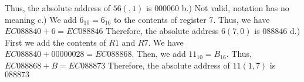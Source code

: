 \documentclass{report}
\begin{document}
    \bigbreak \noindent 
    Thus, the absolute address of $56(,1)$ is $000060$
    \bigbreak \noindent 
    b.) Not valid, notation has no meaning
    \bigbreak \noindent 
    c.) We add $6_{10} = 6_{16}$ to the contents of register 7. Thus, we have $EC088840 + 6 = EC088846$
    \bigbreak \noindent 
    Therefore, the absolute address $6(7,0)$ is $088846$
    \bigbreak \noindent 
    d.) First we add the contents of $R1$ and $R7$. We have $EC088840 + 00000028 = EC088868$. Then, we add $11_{10} = B_{16}$. Thus, $EC088868 + B = EC088873$
    \bigbreak \noindent 
    Therefore, the absolute address of $11(1,7)$ is $088873$















 
\end{document}
